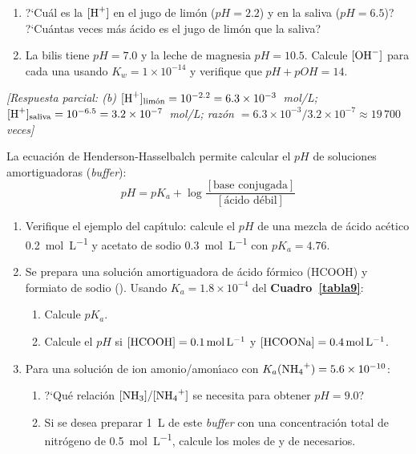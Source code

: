 \begin{bloque_ejercicios}
\begin{ejercicios}
\begin{enumerate}[label=\alph*)]
    \item ?`Cu\'al es la $[\ce{H+}]$ en el jugo de lim\'on
          ($pH = 2.2$) y en la saliva ($pH = 6.5$)?
          ?`Cu\'antas veces m\'as \'acido es el jugo de lim\'on
          que la saliva?

    \item La bilis tiene $pH = 7.0$ y la leche de magnesia
          $pH = 10.5$. Calcule $[\ce{OH^-}]$ para cada una
          usando $K_w = 1\times10^{-14}$ y verifique que
          $pH + pOH = 14$.
\end{enumerate}

\textit{[Respuesta parcial:
(b) $[\ce{H+}]_{\text{lim\'on}} = 10^{-2.2}
    = 6.3\times10^{-3}$~mol/L;
    $[\ce{H+}]_{\text{saliva}} = 10^{-6.5}
    = 3.2\times10^{-7}$~mol/L;
    raz\'on $= 6.3\times10^{-3}/3.2\times10^{-7}
    \approx 19\,700$ veces]}

\item La ecuaci\'on de Henderson-Hasselbalch permite calcular el $pH$
de soluciones amortiguadoras (\textit{buffer}):
\[
    pH = pK_a + \log\frac{[\text{base conjugada}]}{[\text{\'acido d\'ebil}]}
\]

\begin{enumerate}[label=\alph*)]
    \item Verifique el ejemplo del cap\'{\i}tulo: calcule el $pH$ de una
          mezcla de \'acido ac\'etico \SI{0.2}{\mole\per\liter} y acetato de
          sodio \SI{0.3}{\mole\per\liter} con $pK_a = 4.76$.

    \item Se prepara una soluci\'on amortiguadora de \'acido f\'ormico
          (HCOOH) y formiato de sodio ().
          Usando $K_a = 1.8\times10^{-4}$ del
          \textbf{Cuadro~\ref{tabla9}}:
          \begin{enumerate}[label=\roman*)]
              \item Calcule $pK_a$.
              \item Calcule el $pH$ si $[\ce{HCOOH}] = \SI{0.1}{\mole\per\liter}$
                    y $[\ce{HCOONa}] = \SI{0.4}{\mole\per\liter}$.
          \end{enumerate}

    \item Para una soluci\'on de ion amonio/amon\'{\i}aco con
          $K_a(\ce{NH4+}) = 5.6\times10^{-10}$:
          \begin{enumerate}[label=\roman*)]
              \item ?`Qu\'e relaci\'on $[\ce{NH3}]/[\ce{NH4+}]$
                    se necesita para obtener $pH = 9.0$?
              \item Si se desea preparar \SI{1}{\liter} de este
                    \textit{buffer} con una concentraci\'on total
                    de nitr\'ogeno de \SI{0.5}{\mole\per\liter}, calcule
                    los moles de  y de 
                    necesarios.
          \end{enumerate}


\end{enumerate}
\end{ejercicios}
\end{bloque_ejercicios}
